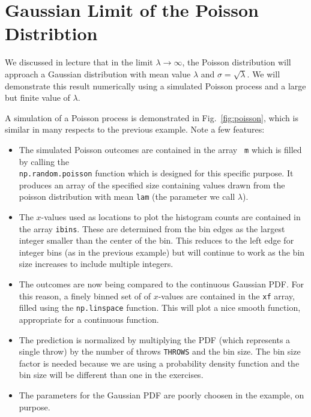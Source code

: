 \section{Gaussian Limit of the Poisson Distribtion}

We discussed in lecture that in the limit $\lambda \to \infty$, the
Poisson distribution will approach a Gaussian distribution with mean
value $\lambda$ and $\sigma = \sqrt{\lambda}$.  We will demonstrate
this result numerically using a simulated Poisson process and a large
but finite value of $\lambda$.

A simulation of a Poisson process is demonstrated in
Fig.~\ref{fig:poisson}, which is similar in many respects to the
previous example.  Note a few features:
\begin{itemize}
\item The simulated Poisson outcomes are contained in the array {\tt
  m} which is filled by calling the \\ {\tt np.random.poisson}
  function which is designed for this specific purpose.  It produces
  an array of the specified size containing values drawn from the
  poisson distribution with mean {\tt lam} (the parameter we call
  $\lambda$).

\item The $x$-values used as locations to plot the histogram counts
  are contained in the array {\tt ibins}.  These are determined from
  the bin edges as the largest integer smaller than the center of the
  bin.  This reduces to the left edge for integer bins (as in the
  previous example) but will continue to work as the bin size
  increases to include multiple integers.

\item The outcomes are now being compared to the continuous Gaussian
  PDF.  For this reason, a finely binned set of of $x$-values are
  contained in the {\tt xf} array, filled using the {\tt np.linspace}
  function.  This will plot a nice smooth function, appropriate for a
  continuous function.
  
\item The prediction is normalized by multiplying the PDF (which
  represents a single throw) by the number of throws {\tt THROWS} and
  the bin size.  The bin size factor is needed because we are using a
  probability density function and the bin size will be different than
  one in the exercises.

\item The parameters for the Gaussian PDF are poorly choosen in the
  example, on purpose.
\end{itemize}

